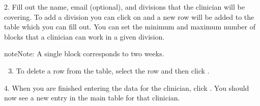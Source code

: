 \documentclass[letterpaper,10pt,english]{sphinxmanual}
\begin{document}
\begin{figure}[htbp]
\centering
{}\end{figure}

\begin{DUlineblock}{0em}
\item[] 
\end{DUlineblock}

2. Fill out the name, email (optional), and divisions that the clinician
will be covering. To add a division you can click on  and a new row
will be added to the table which you can fill out. You can set the minimum
and maximum number of blocks that a clinician can work in a given division.

\begin{sphinxadmonition}{note}{Note:}
A single block corresponds to two weeks.
\end{sphinxadmonition}

\begin{figure}[htbp]
\centering
{}\end{figure}

\begin{DUlineblock}{0em}
\item[] 
\end{DUlineblock}
\begin{enumerate}
\setcounter{enumi}{2}
\item {} 
To delete a row from the table, select the row and then click .

\end{enumerate}

\begin{figure}[htbp]
\centering
{}\end{figure}

\begin{DUlineblock}{0em}
\item[] 
\end{DUlineblock}

4. When you are finished entering the data for the clinician, click .
You should now see a new entry in the main table for that clinician.

\begin{figure}[htbp]
\centering
{}\end{figure}
\end{document}
